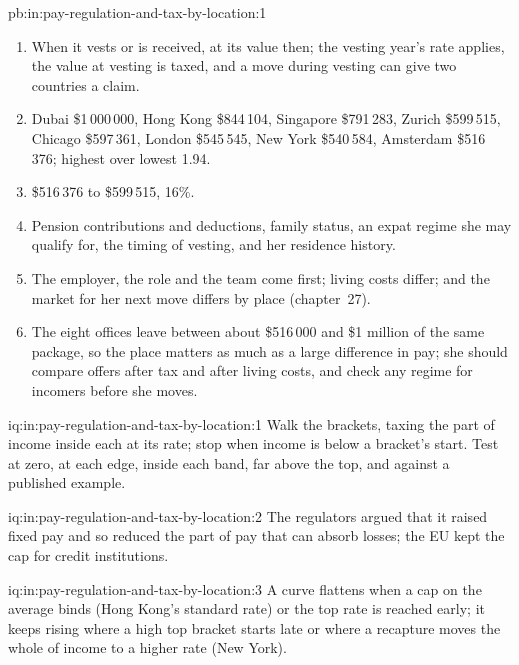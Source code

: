 \begin{solution}{pb:in:pay-regulation-and-tax-by-location:1}
\begin{enumerate}
income and gains for the first four years, not pay for UK work.
\item When it vests or is received, at its value then; the vesting year's rate applies, the value at vesting is taxed, and
a move during vesting can give two countries a claim.
\item Dubai \$1\,000\,000, Hong Kong \$844\,104, Singapore \$791\,283, Zurich \$599\,515, Chicago \$597\,361, London \$545\,545,
New York \$540\,584, Amsterdam \$516\,376; highest over lowest 1.94.
\item \$516\,376 to \$599\,515, 16\%.
\item Pension contributions and deductions, family status, an expat regime she may qualify for, the timing of vesting, and
her residence history.
\item The employer, the role and the team come first; living costs differ; and the market for her next move differs by
place (chapter~27).
\item The eight offices leave between about \$516\,000 and \$1 million of the same package, so the place matters as much as a
large difference in pay; she should compare offers after tax and after living costs, and check any regime for incomers
before she moves.
\end{enumerate}
\end{solution}

\begin{solution}{iq:in:pay-regulation-and-tax-by-location:1}
Walk the brackets, taxing the part of income inside each at its rate; stop when income is below a bracket's start. Test
at zero, at each edge, inside each band, far above the top, and against a published example.
\end{solution}

\begin{solution}{iq:in:pay-regulation-and-tax-by-location:2}
The regulators argued that it raised fixed pay and so reduced the part of pay that can absorb losses; the EU kept the cap
for credit institutions.
\end{solution}

\begin{solution}{iq:in:pay-regulation-and-tax-by-location:3}
A curve flattens when a cap on the average binds (Hong Kong's standard rate) or the top rate is reached early; it keeps
rising where a high top bracket starts late or where a recapture moves the whole of income to a higher rate (New York).
\end{solution}

